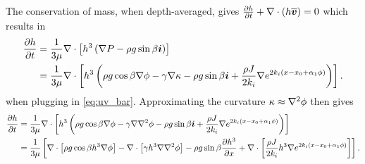 The conservation of mass, when depth-averaged, gives 
$\frac{\partial h}{\partial t} + \nabla \cdot \left( h\overline{\boldsymbol{v}} \right) = 0$
which results in 
\begin{align}
    \begin{aligned}
    \frac{\partial h}{\partial t} &= \frac{1}{3\mu} \nabla \cdot \left[ h^3 \left( \nabla P - \rho g \sin \beta \boldsymbol{i} \right) \right]\\
    &= \frac{1}{3\mu} \nabla \cdot \left[ h^3 \left( \rho g \cos\beta \nabla \phi - \gamma\nabla\kappa - \rho g \sin \beta \boldsymbol{i} + \frac{\rho J}{2k_i}\nabla e^{2k_i \left( x - x_0 + \alpha_1 \phi \right)}  \right) \right]. 
    \end{aligned}
    \label{eq:thin_film_nokappa}
\end{align}
when plugging in \cref{eq:uv_bar}. Approximating the curvature $\kappa \approx \nabla^2 \phi$ then gives 
\begin{align}
    \begin{aligned}
    \frac{\partial h}{\partial t} &= \frac{1}{3\mu} \nabla \cdot \left[ h^3 \left( \rho g \cos\beta \nabla \phi - \gamma\nabla\nabla^2\phi - \rho g \sin \beta \boldsymbol{i} + \frac{\rho J}{2k_i}\nabla e^{2k_i \left( x - x_0 + \alpha_1 \phi \right)} \right) \right]\\
    &= \frac{1}{3\mu} \left[  \nabla \cdot \left[ \rho g \cos \beta h^3 \nabla \phi \right] - \nabla \cdot \left[ \gamma h^3 \nabla\nabla^2\phi \right] - \rho g \sin\beta \frac{\partial h^3}{\partial x} + \nabla \cdot \left[ \frac{\rho J}{2k_i}h^3\nabla e^{2k_i \left( x - x_0 + \alpha_1 \phi \right)} \right] \right].
    \end{aligned}
    \label{eq:thin_film_dim}
\end{align}

